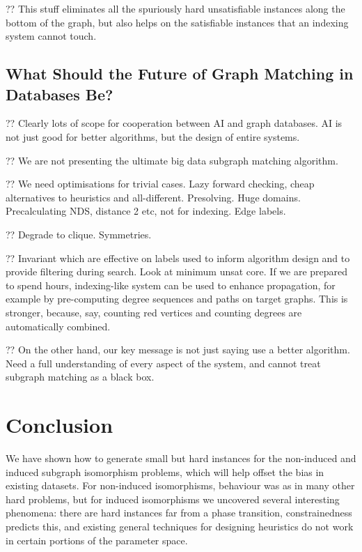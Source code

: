 \documentclass[twoside,11pt]{article}
\begin{document}
?? This stuff eliminates all the spuriously hard unsatisfiable instances along the bottom of the
graph, but also helps on the satisfiable instances that an indexing system cannot touch.

\subsection{What Should the Future of Graph Matching in Databases Be?}

?? Clearly lots of scope for cooperation between AI and graph databases. AI is not just good for
better algorithms, but the design of entire systems.

?? We are not presenting the ultimate big data subgraph matching algorithm.

?? We need optimisations for trivial cases. Lazy forward checking, cheap alternatives to heuristics
and all-different. Presolving. Huge domains.  Precalculating NDS, distance 2 etc, not for indexing.
Edge labels.

?? Degrade to clique. Symmetries.

?? Invariant which are effective on labels used to inform algorithm design and to provide filtering
during search. Look at minimum unsat core. If we are prepared to spend hours, indexing-like system
can be used to enhance propagation, for example by pre-computing degree sequences and paths on
target graphs. This is stronger, because, say, counting red vertices and counting degrees are
automatically combined.

?? On the other hand, our key message is not just saying use a better algorithm. Need a full
understanding of every aspect of the system, and cannot treat subgraph matching as a black box.

\section{Conclusion}

We have shown how to generate small but hard instances for the non-induced and induced subgraph
isomorphism problems, which will help offset the bias in existing datasets. For non-induced
isomorphisms, behaviour was as in many other hard problems, but for induced isomorphisms we
uncovered several interesting phenomena: there are hard instances far from a phase transition,
constrainedness predicts this, and existing general techniques for designing heuristics do not work
in certain portions of the parameter space.
\end{document}
